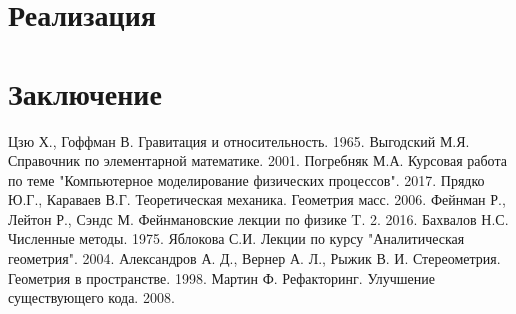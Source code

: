 \documentclass[12pt, a4paper]{extarticle}
\numberwithin{equation}{section}
\begin{document}
 
\section{Реализация} 
 

\newpage
\section*{Заключение}

\newpage

\begin{thebibliography}{**}
	  
	Цзю Х., Гоффман В. Гравитация и относительность. 1965.
	Выгодский М.Я. Справочник по элементарной математике. 2001.
	Погребняк М.А. Курсовая работа по теме "Компьютерное моделирование физических процессов". 2017.
	 Прядко Ю.Г., Караваев В.Г. Теоретическая механика. Геометрия масс. 2006.
	Фейнман Р., Лейтон Р., Сэндс М. Фейнмановские лекции по физике T. 2. 2016.
	 Бахвалов Н.С.  Численные методы. 1975. 
	 Яблокова С.И.   Лекции по курсу "Аналитическая геометрия". 2004. 
	Александров А. Д., Вернер А. Л., Рыжик В. И.  Стереометрия. Геометрия в пространстве. 1998. 
	Мартин Ф. Рефакторинг. Улучшение существующего кода. 2008.
\end{thebibliography}
\end{document}
